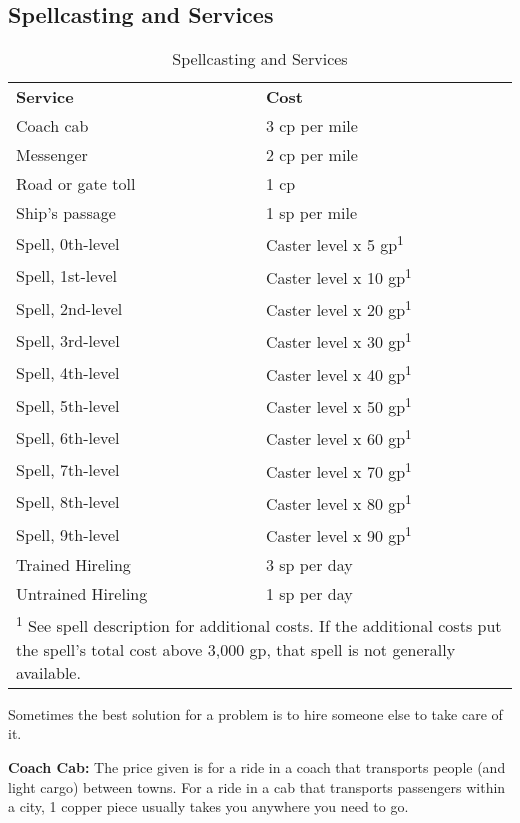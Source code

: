 \subsection{Spellcasting and Services}

\begin{table}[htb]
\caption{Spellcasting and Services}
\centering
\begin{tabular}{l l}
\textbf{Service} & \textbf{Cost}\\
Coach cab & 3 cp per mile\\
Messenger & 2 cp per mile\\
Road or gate toll & 1 cp\\
Ship's passage & 1 sp per mile\\
Spell, 0th-level & Caster level x 5 gp\textsuperscript{1}\\
Spell, 1st-level & Caster level x 10 gp\textsuperscript{1}\\
Spell, 2nd-level & Caster level x 20 gp\textsuperscript{1}\\
Spell, 3rd-level & Caster level x 30 gp\textsuperscript{1}\\
Spell, 4th-level & Caster level x 40 gp\textsuperscript{1}\\
Spell, 5th-level & Caster level x 50 gp\textsuperscript{1}\\
Spell, 6th-level & Caster level x 60 gp\textsuperscript{1}\\
Spell, 7th-level & Caster level x 70 gp\textsuperscript{1}\\
Spell, 8th-level & Caster level x 80 gp\textsuperscript{1}\\
Spell, 9th-level & Caster level x 90 gp\textsuperscript{1}\\
Trained Hireling & 3 sp per day\\
Untrained Hireling & 1 sp per day\\
\multicolumn{2}{p{10.5cm}}{\textsuperscript{1} See spell description for additional costs. If the additional costs put the spell's total cost above 3,000 gp, that spell is not generally available.}\\
\end{tabular}
\end{table}

Sometimes the best solution for a problem is to hire someone else to take care 
of it.

\textbf{Coach Cab:} The price given is for a ride in a coach that transports people 
(and light cargo) between towns. For a ride in a cab that transports passengers 
within a city, 1 copper piece usually takes you anywhere you need to go.

